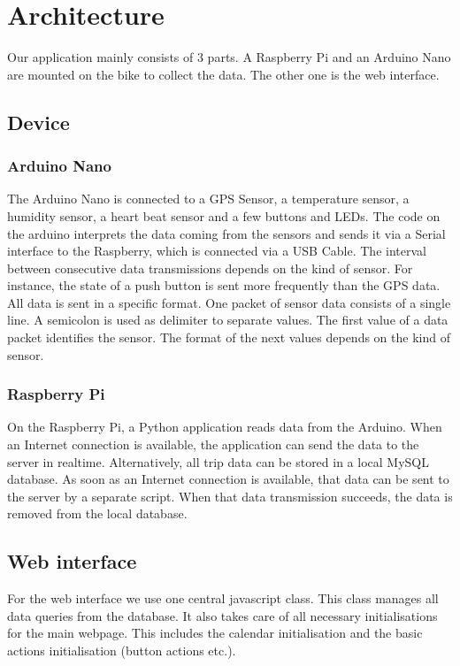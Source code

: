 \section{Architecture}
Our application mainly consists of 3 parts. 
A Raspberry Pi and an Arduino Nano are mounted on the bike to collect the data. 
The other one is the web interface.
\subsection{Device}
\subsubsection{Arduino Nano}
The Arduino Nano is connected to a GPS Sensor, a temperature sensor, a humidity sensor, a heart beat sensor and a few buttons and LEDs. 
The code on the arduino interprets the data coming from the sensors and sends it via a Serial interface to the Raspberry, which is connected via a USB Cable.
The interval between consecutive data transmissions depends on the kind of sensor. 
For instance, the state of a push button is sent more frequently than the GPS data.
All data is sent in a specific format. One packet of sensor data consists of a single line.
A semicolon is used as delimiter to separate values. The first value of a data packet identifies the sensor. 
The format of the next values depends on the kind of sensor.
\subsubsection{Raspberry Pi}
On the Raspberry Pi, a Python application reads data from the Arduino. 
When an Internet connection is available, the application can send the data to the server in realtime.
Alternatively, all trip data can be stored in a local MySQL database. 
As soon as an Internet connection is available, that data can be sent to the server by a separate script.
When that data transmission succeeds, the data is removed from the local database.
\subsection{Web interface}
For the web interface we use one central javascript class. This class manages all data queries from the database.
It also takes care of all necessary initialisations for the main webpage. This includes the calendar initialisation and
the basic actions initialisation (button actions etc.).

